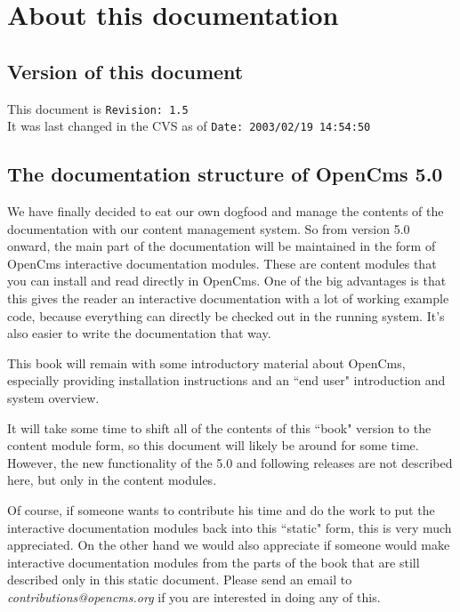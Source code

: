 \chapter{About this documentation}
\label{About this documentation}

\section{Version of this document}

This document is \verb$Revision: 1.5 $  \\
It was last changed in the CVS as of \verb$Date: 2003/02/19 14:54:50 $ \\

\section{The documentation structure of OpenCms 5.0}

We have finally decided to eat our own dogfood and manage the contents of the documentation 
with our content management system.
So from version 5.0 onward, the main part of the documentation will be maintained 
in the form of OpenCms interactive documentation modules.
These are content modules that you can install and read directly in OpenCms.
One of the big advantages is that this gives the reader an interactive documentation 
with a lot of working example code,
because everything can directly be checked out in the running system.
It's also easier to write the documentation that way.

This book will remain with some introductory material about OpenCms,
especially providing installation instructions and an ``end user" introduction and system overview.

It will take some time to shift all of the contents of this ``book" version to 
the content module form, so this document will likely be around for some time.
However, the new functionality of the 5.0 and following releases are not described here,
but only in the content modules.

Of course, if someone wants to contribute his time and do the work to 
put the interactive documentation modules back into this ``static" form, this is very much appreciated. 
On the other hand we would also appreciate if someone would make interactive documentation modules
from the parts of the book that are still described only in this static document.
Please send an email to {\em contributions@opencms.org} if you are interested in doing any of this.

